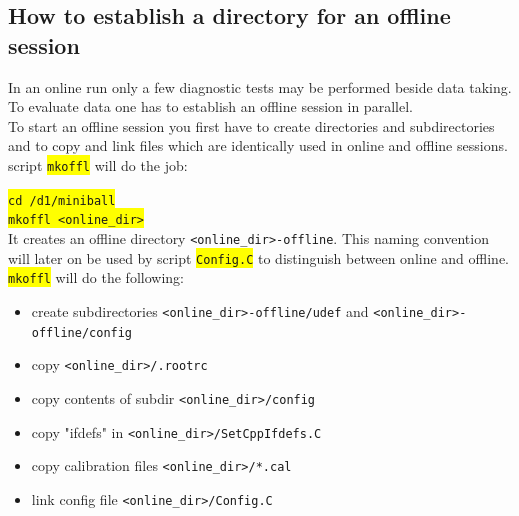 \documentclass[10pt]{article}
\newcommand{\yellow}[1]{\colorbox{yellow}{\texttt{#1}}}
\begin{document}
\subsection{How to establish a directory for an offline session}\label{OfflineSession}\vspace{3mm}

In an online run only a few diagnostic tests may be performed beside data taking.
To evaluate data one has to establish an offline session in parallel.\\

To start an offline session you first have to create directories and subdirectories and to copy and link files which are identically
used in online and offline sessions. script \yellow{mkoffl} will do the job:

\hspace*{.2\linewidth}\yellow{cd /d1/miniball}\\
\hspace*{.2\linewidth}\yellow{mkoffl <online\_dir>}\\

It creates an offline directory \texttt{<online\_dir>-offline}.
This naming convention will later on be used by script \yellow{Config.C} to distinguish between online and offline.\\

\yellow{mkoffl} will do the following:

\begin{center}
\begin{itemize}
\setlength{\rightmargin}{1em}%
\setlength{\leftmargin}{2em}%
\setlength{\itemsep}{0pt}%
\setlength{\parskip}{1mm}%
\setlength{\partopsep}{0pt}%
\setlength{\parsep}{0pt}%
\setlength{\topsep}{0pt}%
\item	create subdirectories \texttt{<online\_dir>-offline/udef} and \texttt{<online\_dir>-offline/config}
\item	copy \texttt{<online\_dir>/.rootrc}
\item	copy contents of subdir \texttt{<online\_dir>/config}
\item	copy "ifdefs" in \texttt{<online\_dir>/SetCppIfdefs.C}
\item	copy calibration files \texttt{<online\_dir>/*.cal}
\item	link config file \texttt{<online\_dir>/Config.C}
\end{itemize}
\end{center}
\end{document}
